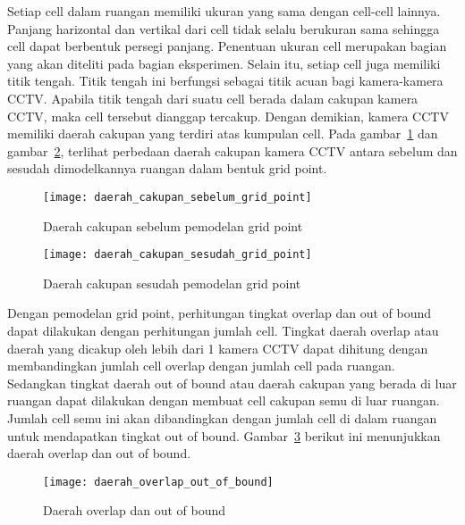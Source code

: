 Setiap cell dalam ruangan memiliki ukuran yang sama dengan cell-cell lainnya. Panjang harizontal dan vertikal dari cell tidak selalu berukuran sama sehingga cell dapat berbentuk persegi panjang. Penentuan ukuran cell merupakan bagian yang akan diteliti pada bagian eksperimen. Selain itu, setiap cell juga memiliki titik tengah. Titik tengah ini berfungsi sebagai titik acuan bagi kamera-kamera CCTV. Apabila titik tengah dari suatu cell berada dalam cakupan kamera CCTV, maka cell tersebut dianggap tercakup. Dengan demikian, kamera CCTV memiliki daerah cakupan yang terdiri atas kumpulan cell. Pada gambar~\ref{fig:daerah_cakupan_sebelum_grid_point} dan gambar~\ref{fig:daerah_cakupan_sesudah_grid_point}, terlihat perbedaan daerah cakupan kamera CCTV antara sebelum dan sesudah dimodelkannya ruangan dalam bentuk grid point.

\begin{figure}[H]
	\centering  
	\texttt{[image: daerah\_cakupan\_sebelum\_grid\_point]}
	\caption[Daerah cakupan sebelum pemodelan grid point]{Daerah cakupan sebelum pemodelan grid point}
	\label{fig:daerah_cakupan_sebelum_grid_point}
\end{figure}

\begin{figure}[H]
	\centering  
	\texttt{[image: daerah\_cakupan\_sesudah\_grid\_point]}
	\caption[Daerah cakupan sesudah pemodelan grid point]{Daerah cakupan sesudah pemodelan grid point}
	\label{fig:daerah_cakupan_sesudah_grid_point}
\end{figure}

Dengan pemodelan grid point, perhitungan tingkat overlap dan out of bound dapat dilakukan dengan perhitungan jumlah cell. Tingkat daerah overlap atau daerah yang dicakup oleh lebih dari 1 kamera CCTV dapat dihitung dengan membandingkan jumlah cell overlap dengan jumlah cell pada ruangan. Sedangkan tingkat daerah out of bound atau daerah cakupan yang berada di luar ruangan dapat dilakukan dengan membuat cell cakupan semu di luar ruangan. Jumlah cell semu ini akan dibandingkan dengan jumlah cell di dalam ruangan untuk mendapatkan tingkat out of bound. Gambar~\ref{fig:daerah_overlap_out_of_bound} berikut ini menunjukkan daerah overlap dan out of bound.

\begin{figure}[H]
	\centering  
	\texttt{[image: daerah\_overlap\_out\_of\_bound]}
	\caption[Daerah overlap dan out of bound]{Daerah overlap dan out of bound}
	\label{fig:daerah_overlap_out_of_bound}
\end{figure}


